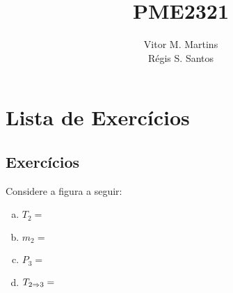 \documentclass[a4paper,12pt]{memoir}
\title{PME2321}
\author{Vitor M. Martins\\ R\'egis S. Santos}
\date{}
\begin{document}
\begin{titlingpage}
  \maketitle
\end{titlingpage}

\tableofcontents

\chapter{Lista de Exercícios}

\section{Exercícios}

\begin{Exerc}[9.69 6\pa Ed.]
Considere a figura a seguir:


 
\begin{enumerate}[a)]
  \item $T_2 =$
  \item $m_2 =$
  \item $P_3 =$
  \item $T_{2 \Rightarrow 3} =$
\end{enumerate}
\end{Exerc}
\end{document}
